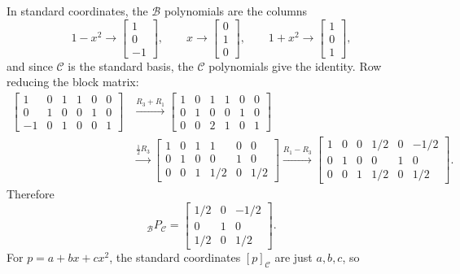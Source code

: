 \begin{example}
\begin{solution}
In standard coordinates, the $\mathcal{B}$ polynomials are the columns
\[
1 - x^2 \to \begin{bmatrix} 1 \\ 0 \\ -1 \end{bmatrix}, \qquad
x \to \begin{bmatrix} 0 \\ 1 \\ 0 \end{bmatrix}, \qquad
1 + x^2 \to \begin{bmatrix} 1 \\ 0 \\ 1 \end{bmatrix},
\]
and since $\mathcal{C}$ is the standard basis, the $\mathcal{C}$ polynomials give the identity. Row reducing the block matrix:
\begin{align*}
\left[\begin{array}{ccc|ccc}
1 & 0 & 1 & 1 & 0 & 0 \\
0 & 1 & 0 & 0 & 1 & 0 \\
-1 & 0 & 1 & 0 & 0 & 1
\end{array}\right]
&\xrightarrow{R_3 + R_1}
\left[\begin{array}{ccc|ccc}
1 & 0 & 1 & 1 & 0 & 0 \\
0 & 1 & 0 & 0 & 1 & 0 \\
0 & 0 & 2 & 1 & 0 & 1
\end{array}\right] \\[0.8em]
&\xrightarrow{\frac{1}{2}R_3}
\left[\begin{array}{ccc|ccc}
1 & 0 & 1 & 1 & 0 & 0 \\
0 & 1 & 0 & 0 & 1 & 0 \\
0 & 0 & 1 & 1/2 & 0 & 1/2
\end{array}\right]
\xrightarrow{R_1 - R_3}
\left[\begin{array}{ccc|ccc}
1 & 0 & 0 & 1/2 & 0 & -1/2 \\
0 & 1 & 0 & 0 & 1 & 0 \\
0 & 0 & 1 & 1/2 & 0 & 1/2
\end{array}\right].
\end{align*}
Therefore
\[
{}_{\mathcal{B}}P_{\mathcal{C}} = \begin{bmatrix} 1/2 & 0 & -1/2 \\ 0 & 1 & 0 \\ 1/2 & 0 & 1/2 \end{bmatrix}.
\]
For $p = a + bx + cx^2$, the standard coordinates $[p]_{\mathcal{C}}$ are just $a, b, c$, so

\end{solution}
\end{example}
